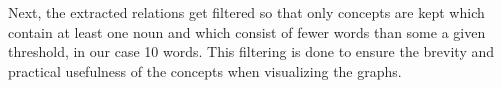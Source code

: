 Next, the extracted relations get filtered so that only concepts are kept which contain at least one noun and which consist of fewer words than some a given threshold, in our case 10 words. This filtering is done to ensure the brevity and practical usefulness of the concepts when visualizing the graphs.
